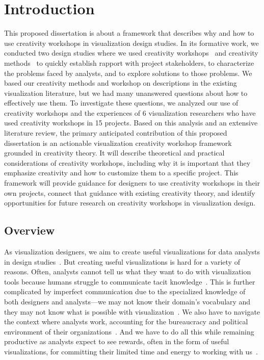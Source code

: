 
\chapter{Introduction}

This proposed dissertation is about a framework that describes why and how to use creativity workshops in visualization design studies. In its formative work, we conducted two design studies where we used creativity workshops~\cite{Kerzner2017} and creativity methods~\cite{Kerzner2015} to quickly establish rapport with project stakeholders, to characterize the problems faced by analysts, and to explore solutions to those problems. We based our creativity methods and workshop on descriptions in the existing visualization literature, but we had many unanswered questions about how to effectively use them. To investigate these questions, we analyzed our use of creativity workshops and the experiences of 6 visualization researchers who have used creativity workshops in 15 projects. Based on this analysis and an extensive literature review, the primary anticipated contribution of this proposed dissertation is an actionable visualization creativity workshop framework grounded in creativity theory. It will describe theoretical and practical considerations of creativity workshops, including why it is important that they emphasize creativity and how to customize them to a specific project. This framework will provide guidance for designers to use creativity workshops in their own projects, connect that guidance with existing creativity theory, and identify opportunities for future research on creativity workshops in visualization design.

\section{Overview}

As visualization designers, we aim to create useful visualizations for data analysts in design studies~\cite{Sedlmair2012}. But creating useful visualizations is hard for a variety of reasons. Often, analysts cannot tell us what they want to do with visualization tools because humans struggle to communicate tacit knowledge~\cite{Polanyi1974}. This is further complicated by imperfect communication due to the specialized knowledge of both designers and analysts---we may not know their domain's vocabulary and they may not know what is possible with visualization~\cite{Wijk2006}. We also have to navigate the context where analysts work, accounting for the bureaucracy and political environment of their organizations~\cite{Sedlmair2010}. And we have to do all this while remaining productive as analysts expect to see rewards, often in the form of useful visualizations, for committing their limited time and energy to working with us~\cite{Sedlmair2010}. 


